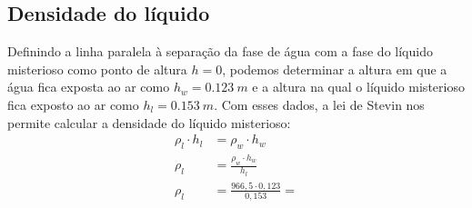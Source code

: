 \subsection{Densidade do líquido}
Definindo a linha paralela à separação da fase de água com a fase do líquido misterioso como ponto de altura \(h = 0\), podemos determinar a altura em que a água fica exposta ao ar como \(h_w = \qty{0,123}{m}\) e a altura na qual o líquido misterioso fica exposto ao ar como \(h_l = \qty{0,153}{m}\). Com esses dados, a lei de Stevin nos permite calcular a densidade do líquido misterioso:
\begin{align*}
    \rho_l \cdot h_l &= \rho_w \cdot h_w\\
    \rho_l &= \frac{\rho_w \cdot h_w}{h_l}\\
    \rho_l &= \frac{966,5 \cdot 0,123}{0,153} =  
\end{align*}